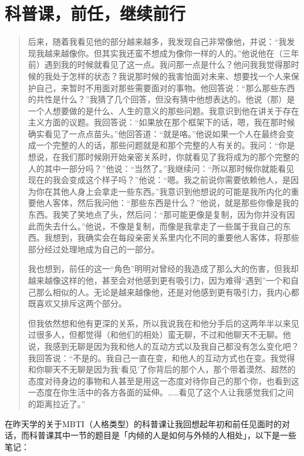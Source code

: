 \chapter{科普课，前任，继续前行}





\blockquote{
	后来，随着我看见他的部分越来越多，我发现自己非常像他，并说：“我发现我越来越像你。但其实我还蛮不想成为像你一样的人的。”他说他在（三年前）遇到我的时候就看见了这一点。我问那一点是什么？他问我我觉得那时候的我处于怎样的状态？我说那时候的我害怕面对未来、想要找一个人来保护自己，来暂时不用面对那些需要面对的事物。他回答说：“那么那些东西的共性是什么？”我猜了几个回答，但没有猜中他想表达的。他说（那）是一个人想要做的是什么、人生的意义的那些问题。我意识到他在讲关于存在主义方面的议题。我回答说：“如果放在那个框架下的话，嗯，我在那时候确实看见了一点点苗头。”他回答道：“就是咯。”他说如果一个人在最终会变成一个完整的人的话，那些问题就是和那个完整的人有关的。我问：“你是想说，在我们那时候刚开始亲密关系时，你就看见了我将成为的那个完整的人的其中一部分吗？”他说：“当然了。”我继续问：“所以那时候你就能看见现在的我会变成这个样子吗？”他说：“嗯。我之前说你需要依赖他人，是因为你在其他人身上会拿走一些东西。”我意识到他想说的可能是我所内化的重要他人客体，然后我问他：“那些东西是什么？”他说，就是那些你像是我的东西。我笑了笑地点了头，然后问：“那可能更像是复制，因为你并没有因此而失去什么。”他说，不像是复制，而像是我拿走了一些属于我自己的东西。我想到，我确实会在每段亲密关系里内化不同的重要他人客体，将那些部分经过处理地成为自己的一部分。

	我也想到，前任的这一“角色”明明对曾经的我造成了那么大的伤害，但我却越来越像这样的他，甚至会对他感到更有吸引力，因为难得“遇到”一个和自己那么相似的人。无论是越来越像他，还是对他感到更有吸引力，我内心都既喜欢又排斥这两个部分。

	但我依然想和他有更深的关系，所以我说我在和他分手后的这两年半以来见过很多人，但都觉得（和他们的相处）蛮无聊，不过和他聊天不无聊。他说，我感到无聊是因为我和他人的互动方式以及我自己都没有怎么变化吧？我回答说：“不是的。我自己一直在变，和他人的互动方式也在变。我觉得和你聊天不无聊是因为我‘看见’了你背后的那个人，那个带着漠然、超然的态度对待身边的事物和人甚至是用这一态度对待你自己的那个你，也看到这一态度在你生活中的各方各面的延伸。……看见了这个人让我感觉我们之间的距离拉近了。”

}

在昨天学的关于MBTI（人格类型）的科普课让我回想起年初和前任见面时的对话，而科普课其中一节的题目是「内倾的人是如何与外倾的人相处」，以下是一些笔记：


